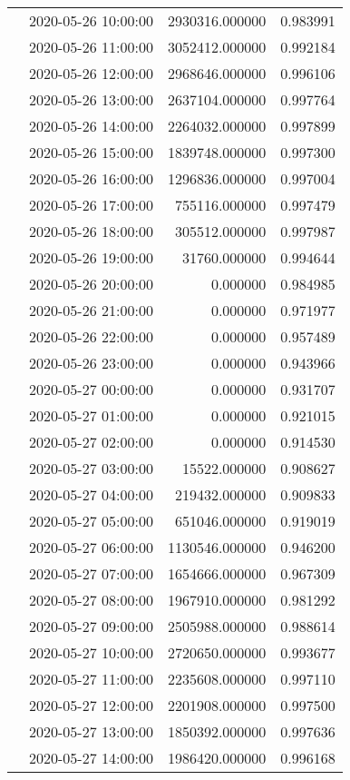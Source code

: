 \begin{tabular}{llrr}
 & 2020-05-26 10:00:00 & 2930316.000000 & 0.983991 \\
 & 2020-05-26 11:00:00 & 3052412.000000 & 0.992184 \\
 & 2020-05-26 12:00:00 & 2968646.000000 & 0.996106 \\
 & 2020-05-26 13:00:00 & 2637104.000000 & 0.997764 \\
 & 2020-05-26 14:00:00 & 2264032.000000 & 0.997899 \\
 & 2020-05-26 15:00:00 & 1839748.000000 & 0.997300 \\
 & 2020-05-26 16:00:00 & 1296836.000000 & 0.997004 \\
 & 2020-05-26 17:00:00 & 755116.000000 & 0.997479 \\
 & 2020-05-26 18:00:00 & 305512.000000 & 0.997987 \\
 & 2020-05-26 19:00:00 & 31760.000000 & 0.994644 \\
 & 2020-05-26 20:00:00 & 0.000000 & 0.984985 \\
 & 2020-05-26 21:00:00 & 0.000000 & 0.971977 \\
 & 2020-05-26 22:00:00 & 0.000000 & 0.957489 \\
 & 2020-05-26 23:00:00 & 0.000000 & 0.943966 \\
 & 2020-05-27 00:00:00 & 0.000000 & 0.931707 \\
 & 2020-05-27 01:00:00 & 0.000000 & 0.921015 \\
 & 2020-05-27 02:00:00 & 0.000000 & 0.914530 \\
 & 2020-05-27 03:00:00 & 15522.000000 & 0.908627 \\
 & 2020-05-27 04:00:00 & 219432.000000 & 0.909833 \\
 & 2020-05-27 05:00:00 & 651046.000000 & 0.919019 \\
 & 2020-05-27 06:00:00 & 1130546.000000 & 0.946200 \\
 & 2020-05-27 07:00:00 & 1654666.000000 & 0.967309 \\
 & 2020-05-27 08:00:00 & 1967910.000000 & 0.981292 \\
 & 2020-05-27 09:00:00 & 2505988.000000 & 0.988614 \\
 & 2020-05-27 10:00:00 & 2720650.000000 & 0.993677 \\
 & 2020-05-27 11:00:00 & 2235608.000000 & 0.997110 \\
 & 2020-05-27 12:00:00 & 2201908.000000 & 0.997500 \\
 & 2020-05-27 13:00:00 & 1850392.000000 & 0.997636 \\
 & 2020-05-27 14:00:00 & 1986420.000000 & 0.996168 \\

\end{tabular}

